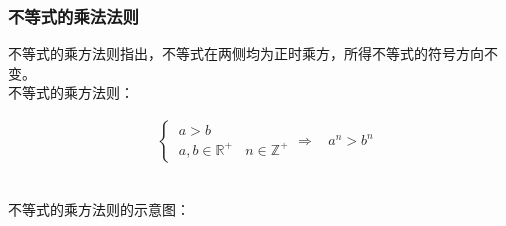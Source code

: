 \documentclass[UTF8]{ctexart}
\begin{document}
\newpage

\subsubsection{不等式的乘法法则}    
    不等式的乘方法则指出，不等式在两侧均为正时乘方，所得不等式的符号方向不变。\\[3mm]
    不等式的乘方法则：
    \begin{large}
        \begin{align*}
            &\begin{cases}
                ~a>b\\[3mm]
                ~a,b\in\mathbb{R^+}~~~~n\in\mathbb{Z^+}
            \end{cases}
            \Longrightarrow~~~~a^n>b^n
        \end{align*}
    \end{large}\\[3mm]
    不等式的乘方法则的示意图：
\end{document}
